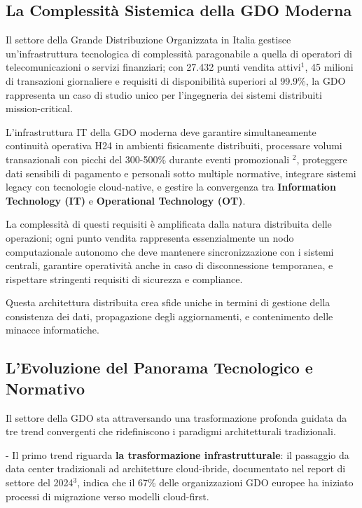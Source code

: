 \documentclass[12pt,a4paper,oneside]{book}
\numberwithin{figure}{chapter} %
\numberwithin{table}{chapter}  %
\begin{document}
\subsection{\texorpdfstring{\textbf{La Complessità Sistemica
della GDO
Moderna}}{1.1.1 La Complessità Sistemica della GDO Moderna}}\label{la-complessituxe0-sistemica-della-gdo-moderna}

Il settore della Grande Distribuzione Organizzata in Italia gestisce
un'infrastruttura tecnologica di complessità paragonabile a quella di
operatori di telecomunicazioni o servizi finanziari; con 27.432 punti
vendita attivi$^1$, 45 milioni di transazioni giornaliere e requisiti di
disponibilità superiori al 99.9\%, la GDO rappresenta un caso di studio
unico per l'ingegneria dei sistemi distribuiti mission-critical.

L'infrastruttura IT della GDO moderna deve garantire simultaneamente
continuità operativa H24 in ambienti fisicamente distribuiti, processare
volumi transazionali con picchi del 300-500\% durante eventi
promozionali $^2$, proteggere dati sensibili di pagamento e personali sotto
multiple normative, integrare sistemi legacy con tecnologie
cloud-native, e gestire la convergenza tra \textbf{Information Technology (IT)} e
\textbf{Operational Technology (OT)}.

La complessità di questi requisiti è amplificata dalla natura
distribuita delle operazioni; ogni punto vendita rappresenta
essenzialmente un nodo computazionale autonomo che deve mantenere
sincronizzazione con i sistemi centrali, garantire operatività anche in
caso di disconnessione temporanea, e rispettare stringenti requisiti di
sicurezza e compliance.

Questa architettura distribuita crea sfide uniche in termini di gestione
della consistenza dei dati, propagazione degli aggiornamenti, e
contenimento delle minacce informatiche.

\subsection{\texorpdfstring{\textbf{L'Evoluzione del Panorama
Tecnologico e
Normativo}}{L'Evoluzione del Panorama Tecnologico e Normativo}}\label{levoluzione-del-panorama-tecnologico-e-normativo}

Il settore della GDO sta attraversando una trasformazione profonda
guidata da tre trend convergenti che ridefiniscono i paradigmi
architetturali tradizionali.

- Il primo trend riguarda \textbf{la trasformazione infrastrutturale}:
il passaggio da data center tradizionali ad architetture cloud-ibride,
documentato nel report di settore del 2024$^3$, indica che il 67\% delle
organizzazioni GDO europee ha iniziato processi di migrazione verso
modelli cloud-first.
\end{document}
